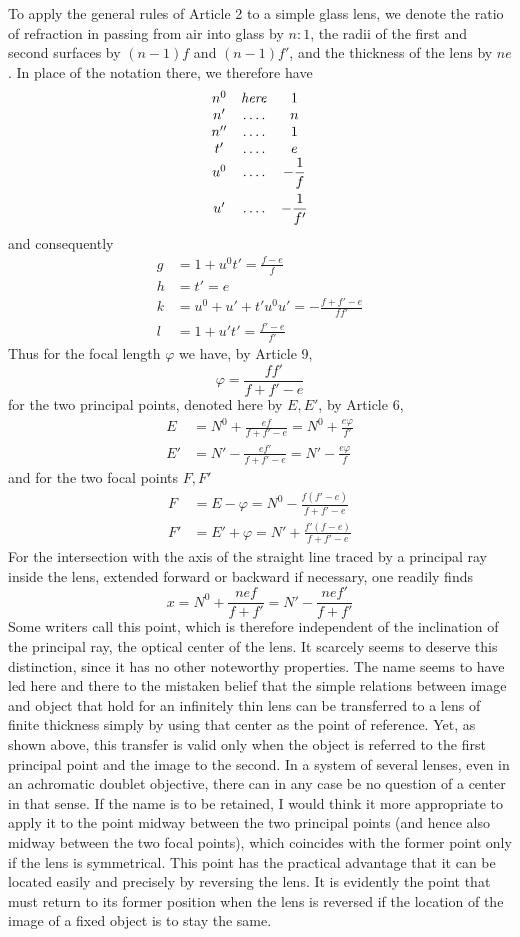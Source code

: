 To apply the general rules of Article 2 to a simple glass lens, we denote the ratio of refraction in passing from air into glass by $n:1$, the radii of the first and second surfaces by $(n-1)f$ and $(n-1)f'$, and the thickness of the lens by $ne$. In place of the notation there, we therefore have
\[
\begin{array}{ccc}
n^0&\mathit{here}&1\\
n'&.\,.\,.\,.&n\\
n''&.\,.\,.\,.&1\\
t'&.\,.\,.\,.&e\\
u^0&.\,.\,.\,.&-\dfrac1f\\\noalign{\vskip 4pt}
u'&.\,.\,.\,.&-\dfrac1{f'}
\end{array}
\]
and consequently
\[
\begin{aligned}
g&=1+u^0t'=\frac{f-e}{f}\\
h&=t'=e\\
k&=u^0+u'+t'u^0u'=-\frac{f+f'-e}{ff'}\\
l&=1+u't'=\frac{f'-e}{f'}
\end{aligned}
\]
Thus for the focal length $\varphi$ we have, by Article 9,
\[
\varphi=\frac{ff'}{f+f'-e}
\]
for the two principal points, denoted here by $E,E'$, by Article 6,
\[
\begin{aligned}
E&=N^0+\frac{ef}{f+f'-e}=N^0+\frac{e\varphi}{f'}\\
E'&=N'-\frac{ef'}{f+f'-e}=N'-\frac{e\varphi}{f}
\end{aligned}
\]
and for the two focal points $F,F'$
\[
\begin{aligned}
F&=E-\varphi=N^0-\frac{f(f'-e)}{f+f'-e}\\
F'&=E'+\varphi=N'+\frac{f'(f-e)}{f+f'-e}
\end{aligned}
\]
For the intersection with the axis of the straight line traced by a principal ray inside the lens, extended forward or backward if necessary, one readily finds
\[
x=N^0+\frac{nef}{f+f'}=N'-\frac{nef'}{f+f'}
\]
Some writers call this point, which is therefore independent of the inclination of the principal ray, the optical center of the lens. It scarcely seems to deserve this distinction, since it has no other noteworthy properties. The name seems to have led here and there to the mistaken belief that the simple relations between image and object that hold for an infinitely thin lens can be transferred to a lens of finite thickness simply by using that center as the point of reference. Yet, as shown above, this transfer is valid only when the object is referred to the first principal point and the image to the second. In a system of several lenses, even in an achromatic doublet objective, there can in any case be no question of a center in that sense. If the name is to be retained, I would think it more appropriate to apply it to the point midway between the two
principal points (and hence also midway between the two focal points), which coincides with the former point only if the lens is symmetrical. This point has the practical advantage that it can be located easily and precisely by reversing the lens. It is evidently the point that must return to its former position when the lens is reversed if the location of the image of a fixed object is to stay the same.

